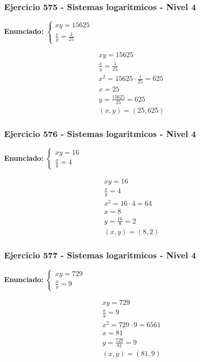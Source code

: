 \documentclass[12pt,a4paper]{article}
\begin{document}
\subsubsection*{Ejercicio 575 - Sistemas logaritmicos - Nivel 4}
\textbf{Enunciado:} \(\begin{cases} xy=15625\\ \frac{x}{y}=\frac{1}{25}\end{cases}\)

\[
\begin{aligned}
xy=15625\\
\frac{x}{y}=\frac{1}{25}\\
x^2=15625\cdot \frac{1}{25}=625\\
x=25\\
y=\frac{15625}{25}=625\\
\boxed{(x,y)=(25,625)}
\end{aligned}
\]


\subsubsection*{Ejercicio 576 - Sistemas logaritmicos - Nivel 4}
\textbf{Enunciado:} \(\begin{cases} xy=16\\ \frac{x}{y}=4\end{cases}\)

\[
\begin{aligned}
xy=16\\
\frac{x}{y}=4\\
x^2=16\cdot 4=64\\
x=8\\
y=\frac{16}{8}=2\\
\boxed{(x,y)=(8,2)}
\end{aligned}
\]


\subsubsection*{Ejercicio 577 - Sistemas logaritmicos - Nivel 4}
\textbf{Enunciado:} \(\begin{cases} xy=729\\ \frac{x}{y}=9\end{cases}\)

\[
\begin{aligned}
xy=729\\
\frac{x}{y}=9\\
x^2=729\cdot 9=6561\\
x=81\\
y=\frac{729}{81}=9\\
\boxed{(x,y)=(81,9)}
\end{aligned}
\]
\end{document}
